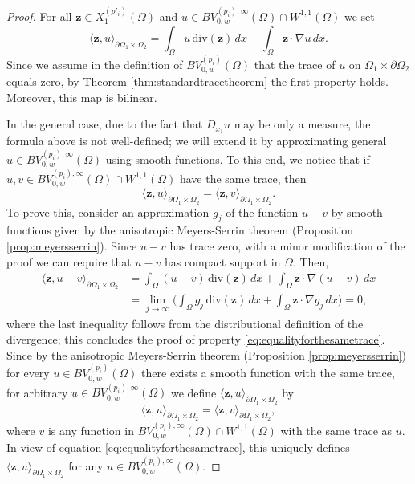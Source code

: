 \documentclass[reqno,12pt]{amsart}
\numberwithin{equation}{section}
\begin{document}
\begin{proof}
For all $\mathbf{z} \in X_1^{(p'_i)}(\Omega)$ and $u \in BV_{0,w}^{(p_i), \infty}(\Omega) \cap W^{1,1}(\Omega)$ we set
\begin{equation}\label{eq:definitionofbilinearform}
\langle \mathbf{z}, u \rangle_{\partial\Omega_1 \times \Omega_2} = \int_\Omega u \, \mathrm{div}(\mathbf{z}) \, dx + \int_\Omega \mathbf{z} \cdot \nabla u \, dx.    
\end{equation}
Since we assume in the definition of $BV_{0,w}^{(p_i)}(\Omega)$ that the trace of $u$ on $\Omega_1 \times \partial\Omega_2$ equals zero, by Theorem \ref{thm:standardtracetheorem} the first property holds. Moreover, this map is bilinear. 

In the general case, due to the fact that $D_{x_1} u$ may be only a measure, the formula above is not well-defined; we will extend it by approximating general $u \in BV_{0,w}^{(p_i), \infty}(\Omega)$ using smooth functions. To this end, we notice that if $u, v \in BV_{0,w}^{(p_i), \infty}(\Omega) \cap W^{1,1}(\Omega)$ have the same trace, then
\begin{equation}\label{eq:equalityforthesametrace}
\langle \mathbf{z}, u \rangle_{\partial\Omega_1 \times \Omega_2} = \langle \mathbf{z}, v \rangle_{\partial\Omega_1 \times \Omega_2}.
\end{equation}
To prove this, consider an approximation $g_j$ of the function $u - v$ by smooth functions given by the anisotropic Meyers-Serrin theorem (Proposition \ref{prop:meyersserrin}). Since $u-v$ has trace zero, with a minor modification of the proof we can require that $u-v$ has compact support in $\Omega$. Then,
\begin{align}
\langle \mathbf{z}, u - v \rangle_{\partial\Omega_1 \times \Omega_2} &= \int_\Omega (u - v) \, \mathrm{div}(\mathbf{z}) \, dx + \int_\Omega \mathbf{z} \cdot \nabla(u - v) \, dx \\
&= \lim_{j \rightarrow \infty} \bigg( \int_\Omega g_j \, \mathrm{div}(\mathbf{z}) \, dx + \int_\Omega \mathbf{z} \cdot \nabla g_j \, dx\bigg) = 0,
\end{align}
where the last inequality follows from the distributional definition of the divergence; this concludes the proof of property \eqref{eq:equalityforthesametrace}. Since by the anisotropic Meyers-Serrin theorem (Proposition \ref{prop:meyersserrin}) for every $u \in BV_{0,w}^{(p_i)}(\Omega)$ there exists a smooth function with the same trace, for arbitrary $u \in BV_{0,w}^{(p_i), \infty}(\Omega)$ we define $\langle \mathbf{z}, u \rangle_{\partial\Omega_1 \times \Omega_2}$ by
$$ \langle \mathbf{z}, u \rangle_{\partial\Omega_1 \times \Omega_2} = \langle \mathbf{z}, v \rangle_{\partial\Omega_1 \times \Omega_2},$$
where $v$ is any function in $BV_{0,w}^{(p_i), \infty}(\Omega) \cap W^{1,1}(\Omega)$ with the same trace as $u$. In view of equation \eqref{eq:equalityforthesametrace}, this uniquely defines $\langle \mathbf{z}, u \rangle_{\partial\Omega_1 \times \Omega_2}$ for any $u \in BV_{0,w}^{(p_i), \infty}(\Omega)$.


\end{proof}
\end{document}
